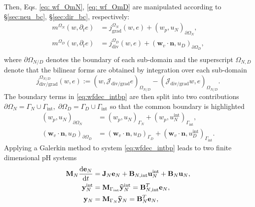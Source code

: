 \documentclass{ifacconf}
\newcommand{\secref}[1]{\S\ref{#1}}
\begin{document}
Then, Eqs. \eqref{eq: wf_OmN}, \eqref{eq: wf_OmD} are manipulated according to \secref{sec:neu_bc}, \secref{sec:dir_bc}, respectively:
\begin{equation}
\label{eq:wfdec_intbp}
\begin{aligned}
m^{\Omega_N}(w, \partial_t{e}) &= j_{\text{grad}}^{\Omega_N}(w, e) + \left(w_p, u_N \right)_{\partial \Omega_N}, \\
m^{\Omega_D}(w, \partial_t{e}) &= j_{\text{div}}^{\Omega_D}(w, e) + \left(\bm{w}_v \cdot \bm{n}, u_D \right)_{\partial \Omega_D}, \\
\end{aligned}
\end{equation}
where $\partial \Omega_{N/D}$ denotes the boundary of each sub-domain and the superscript ${\Omega_{N,D}}$ denote that the bilinear forms are obtained by integration over each sub-domain
\[
j_{\text{div/grad}}^{\Omega_{N/D}}(w, e) := \left(w, \mathcal{J}_{\text{div/grad}}  e \right)_{\Omega_{N/D}} - \left(\mathcal{J}_{\text{div/grad}}  w, e \right)_{\Omega_{N/D}}.
\]
The boundary terms in \eqref{eq:wfdec_intbp} are then split into two contributions $\partial\Omega_N = \Gamma_N \cup \Gamma_{\text{int}}, \; \partial\Omega_D = \Gamma_D \cup \Gamma_{\text{int}}$ so that the common boundary is highlighted
\begin{align*}
\left(w_p, u_N \right)_{\partial \Omega_N} &= \left(w_p, u_N \right)_{\Gamma_N} + \left(w_p, u_N^{\text{int}}\right)_{\Gamma_{\text{int}}}, \\
\left(\bm{w}_v \cdot \bm{n}, u_D \right)_{\partial \Omega_D} &= \left(\bm{w}_v \cdot \bm{n}, u_D \right)_{\Gamma_D} + \left(\bm{w}_v \cdot \bm{n}, u_D^{\text{int}} \right)_{\Gamma_{\text{int}}}.
\end{align*}
Applying a Galerkin method to system \eqref{eq:wfdec_intbp} leads to two finite dimensional pH systems 
\begin{equation}
\label{eq:fd_N}
\begin{aligned}
\mathbf{M}_N \diff{\mathbf{e}_N}{t} &= \mathbf{J}_N \mathbf{e}_N + \mathbf{B}_{N, \text{int}} \mathbf{u}_N^{\text{int}} + \mathbf{B}_N \mathbf{u}_N, \\
\mathbf{y}_N^{\text{int}} &= \mathbf{M}_{\Gamma_{\text{int}}} \widehat{\mathbf{y}}_N^{\text{int}} =  \mathbf{B}_{N, \text{int}}^T \mathbf{e}_N, \\
\mathbf{y}_N &= \mathbf{M}_{\Gamma_N} \widehat{\mathbf{y}}_N = \mathbf{B}_{N}^T \mathbf{e}_N, \\
\end{aligned}
\end{equation}
\end{document}
